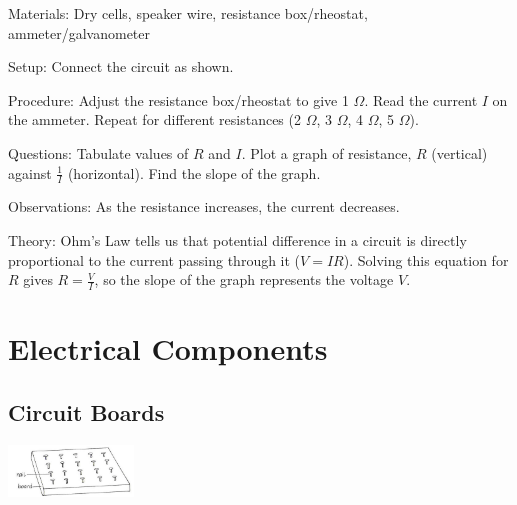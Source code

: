 \begin{multicols}{2}
\begin{description*}
\item[Materials:]{Dry cells, speaker wire, resistance box/rheostat, ammeter/galvanometer}
\item[Setup:]{Connect the circuit as shown.}
\item[Procedure:]{Adjust the resistance box/rheostat to give 1 $\Omega$. Read the current $I$ on the ammeter. Repeat for different resistances (2 $\Omega$, 3 $\Omega$, 4 $\Omega$, 5 $\Omega$).}
\item[Questions:]{Tabulate values of $R$ and $I$. Plot a graph of resistance, $R$ (vertical) against $\frac{1}{I}$ (horizontal). Find the slope of the graph.}
\item[Observations:]{As the resistance increases, the current decreases.}
\item[Theory:]{Ohm's Law tells us that potential difference in a circuit is directly proportional to the current passing through it ($V = IR$). Solving this equation for $R$ gives $R = \frac{V}{I}$, so the slope of the graph represents the voltage $V$.}
\end{description*}


\section*{Electrical Components}


\subsection{Circuit Boards}

\begin{center}
\includegraphics[width=0.25\textwidth]{./img/vso/circuit-board.png}
\end{center}


\end{multicols}
